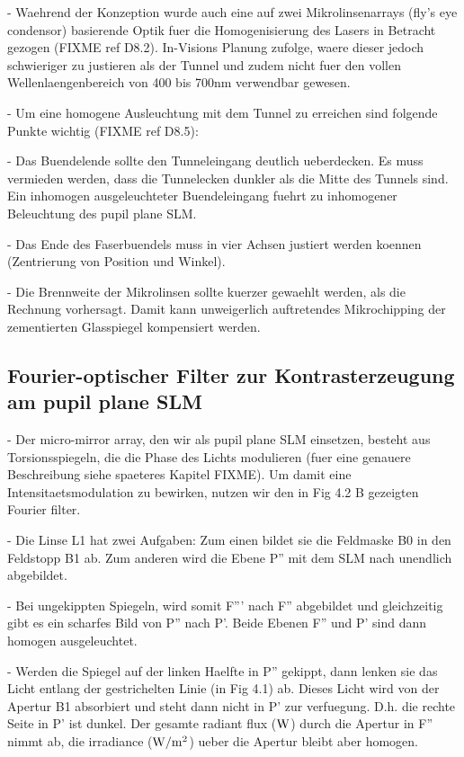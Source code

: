 - Waehrend der Konzeption wurde auch eine auf zwei Mikrolinsenarrays    %
   (fly's eye condensor) basierende Optik fuer die Homogenisierung des Lasers in
   Betracht gezogen (FIXME ref D8.2). In-Visions Planung zufolge,
   waere dieser jedoch schwieriger zu justieren als der Tunnel und
   zudem nicht fuer den vollen Wellenlaengenbereich von 400 bis 700nm
   verwendbar gewesen.

  - Um eine homogene Ausleuchtung mit dem Tunnel zu erreichen sind       %
    folgende Punkte wichtig (FIXME ref D8.5):

   - Das Buendelende sollte den Tunneleingang deutlich ueberdecken. Es
     muss vermieden werden, dass die Tunnelecken dunkler als die Mitte
     des Tunnels sind. Ein inhomogen ausgeleuchteter Buendeleingang
     fuehrt zu inhomogener Beleuchtung des pupil plane SLM.

   - Das Ende des Faserbuendels muss in vier Achsen justiert werden
     koennen (Zentrierung von Position und Winkel).

   - Die Brennweite der Mikrolinsen sollte kuerzer gewaehlt werden,
     als die Rechnung vorhersagt. Damit kann unweigerlich auftretendes
     Mikrochipping der zementierten Glasspiegel kompensiert werden.

\subsection{ Fourier-optischer Filter zur Kontrasterzeugung am pupil plane SLM}
  - Der micro-mirror array, den wir als pupil plane SLM einsetzen,        %
    besteht aus Torsionsspiegeln, die die Phase des Lichts modulieren
    (fuer eine genauere Beschreibung siehe spaeteres Kapitel               
    FIXME). Um damit eine Intensitaetsmodulation zu bewirken, nutzen
    wir den in Fig 4.2 B gezeigten Fourier filter. 

  - Die Linse L1 hat zwei Aufgaben: Zum einen bildet sie die Feldmaske   %
    B0 in den Feldstopp B1 ab. Zum anderen wird die Ebene P'' mit dem
    SLM nach unendlich abgebildet.

  - Bei ungekippten Spiegeln, wird somit F''' nach F'' abgebildet und    %
    gleichzeitig gibt es ein scharfes Bild von P'' nach P'. Beide
    Ebenen F'' und P' sind dann homogen ausgeleuchtet.

  - Werden die Spiegel auf der linken Haelfte in P'' gekippt, dann
    lenken sie das Licht entlang der gestrichelten Linie (in Fig 4.1)
    ab. Dieses Licht wird von der Apertur B1 absorbiert und steht dann
    nicht in P' zur verfuegung. D.h. die rechte Seite in P' ist
    dunkel. Der gesamte radiant flux ($\unit[]{W}$) durch die Apertur in
    F'' nimmt ab, die irradiance ($\unit[]{W/m^2}$) ueber die Apertur
    bleibt aber homogen.


